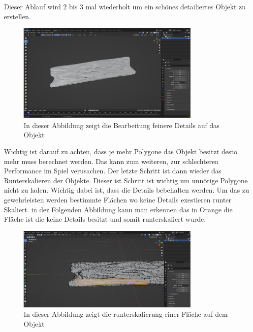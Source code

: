 \noindent Dieser Ablauf wird 2 bis 3 mal wiederholt um ein schönes detailiertes Objekt zu erstellen.
\begin{figure}[H]
    \centering
    \includegraphics[width=0.8\textwidth]{chapters/13/images/HolzBrett2.png}
    \caption{In dieser Abbildung zeigt die Bearbeitung feinere Details auf das Objekt}
    \label{UST-16}
\end{figure}
\noindent Wichtig ist darauf zu achten, dass je mehr Polygone das Objekt besitzt desto mehr muss berechnet werden. Das kann zum weiteren, zur schlechteren Performance im Spiel verusachen. Der letzte Schritt ist dann wieder das Runterskalieren der Objekte. Dieser ist Schritt ist wichtig um unnötige Polygone nicht zu laden. Wichtig dabei ist, dass die Details bebehalten werden. Um das zu gewehrleisten werden bestimmte Flächen wo keine Details exestieren runter Skaliert. in der Folgenden Abbildung kann man erkennen das in Orange die Fläche ist die keine Details besitzt und somit runterskaliert wurde.

\begin{figure}[H]
    \centering
    \includegraphics[width=0.8\textwidth]{chapters/13/images/HolzBrett3.png}
    \caption{In dieser Abbildung zeigt die runterskalierung einer Fläche auf dem Objekt}
    \label{UST-17}
\end{figure}